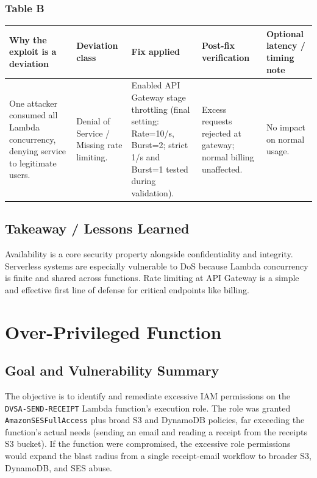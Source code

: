 \documentclass[12pt]{report}
\begin{document}
\subsection*{Table B}
\begin{table}[H]
  \footnotesize\centering
  \begin{tabularx}{\textwidth}{|Y|Y|Y|Y|Y|}
    \hline
    \textbf{Why the exploit is a deviation} & \textbf{Deviation class} & \textbf{Fix applied} & \textbf{Post-fix verification} & \textbf{Optional latency / timing note} \\
    \hline
    One attacker consumed all Lambda concurrency, denying service to legitimate users. &
    Denial of Service / Missing rate limiting. &
    Enabled API Gateway stage throttling (final setting: Rate=10/s, Burst=2; strict 1/s and Burst=1 tested during validation). &
    Excess requests rejected at gateway; normal billing unaffected. &
    No impact on normal usage. \\
    \hline
  \end{tabularx}
\end{table}

\section{Takeaway / Lessons Learned}
Availability is a core security property alongside confidentiality and integrity. Serverless systems are especially vulnerable to DoS because Lambda concurrency is finite and shared across functions. Rate limiting at API Gateway is a simple and effective first line of defense for critical endpoints like billing.

\clearpage

\chapter{Over-Privileged Function}

\section{Goal and Vulnerability Summary}
The objective is to identify and remediate excessive IAM permissions on the \texttt{DVSA-SEND-RECEIPT} Lambda function's execution role. The role was granted \texttt{AmazonSESFullAccess} plus broad S3 and DynamoDB policies, far exceeding the function's actual needs (sending an email and reading a receipt from the receipts S3 bucket). If the function were compromised, the excessive role permissions would expand the blast radius from a single receipt-email workflow to broader S3, DynamoDB, and SES abuse.
\end{document}
